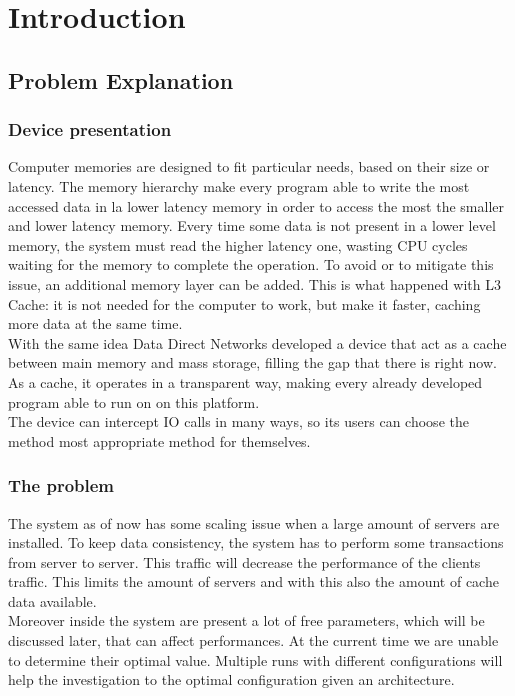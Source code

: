\section{Introduction}

\subsection{Problem Explanation}
\subsubsection*{Device presentation}
Computer memories are designed to fit particular needs, based on their size or
latency. The memory hierarchy make every program able to write the most accessed
data in la lower latency memory in order to access the most the smaller and
lower latency memory. Every time some data is not present in a lower level
memory, the system must read the higher latency one, wasting CPU cycles waiting
for the memory to complete the operation. To avoid or to mitigate this issue, an
additional memory layer can be added. This is what happened with L3 Cache: it is
not needed for the computer to work, but make it faster, caching more data at
the same time. \\
With the same idea Data Direct Networks developed a device that act as a cache
between main memory and mass storage, filling the gap that there is right now.
\\ As a cache, it operates in a transparent way, making every already developed
program able to run on on this platform. \\ The device can intercept IO calls in
many ways, so its users can choose the method most appropriate method for
themselves.

\subsubsection*{The problem}
The system as of now has some scaling issue when a large amount of servers are
installed. To keep data consistency, the system has to perform some transactions
from server to server. This traffic will decrease the performance of the
clients traffic. This limits the amount of servers and with this also the amount
of cache data available. \\
Moreover inside the system are present a lot of free parameters, which will be
discussed later, that can affect performances. At the current time we are
unable to determine their optimal value. Multiple runs with different
configurations will help the investigation to the optimal configuration given an
architecture.


